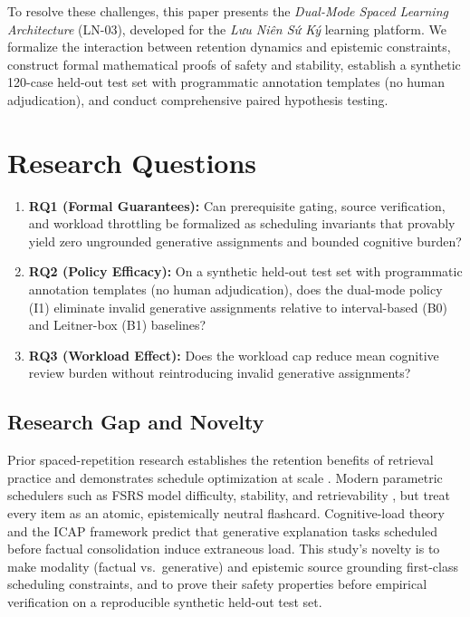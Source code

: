 \documentclass[11pt,a4paper]{article}
\begin{document}
To resolve these challenges, this paper presents the \textit{Dual-Mode Spaced Learning Architecture} (LN-03), developed for the \textit{Lưu Niên Sứ Ký} learning platform. We formalize the interaction between retention dynamics and epistemic constraints, construct formal mathematical proofs of safety and stability, establish a synthetic 120-case held-out test set with programmatic annotation templates (no human adjudication), and conduct comprehensive paired hypothesis testing.

\section{Research Questions}

\begin{enumerate}[label=\textbf{RQ\arabic*}, leftmargin=2.4em]
    \item \textbf{RQ1 (Formal Guarantees):} Can prerequisite gating, source verification, and workload throttling be formalized as scheduling invariants that provably yield zero ungrounded generative assignments and bounded cognitive burden?
    \item \textbf{RQ2 (Policy Efficacy):} On a synthetic held-out test set with programmatic annotation templates (no human adjudication), does the dual-mode policy (I1) eliminate invalid generative assignments relative to interval-based (B0) and Leitner-box (B1) baselines?
    \item \textbf{RQ3 (Workload Effect):} Does the workload cap reduce mean cognitive review burden without reintroducing invalid generative assignments?
\end{enumerate}

\subsection{Research Gap and Novelty}

Prior spaced-repetition research establishes the retention benefits of retrieval practice \cite{roediger2006, karpicke2008} and demonstrates schedule optimization at scale \cite{settles2016half, tabibian2019}. Modern parametric schedulers such as FSRS model difficulty, stability, and retrievability \cite{ye2024fsrs}, but treat every item as an atomic, epistemically neutral flashcard. Cognitive-load theory \cite{sweller1988} and the ICAP framework \cite{chi2009} predict that generative explanation tasks scheduled before factual consolidation induce extraneous load. This study's novelty is to make modality (factual vs.\ generative) and epistemic source grounding first-class scheduling constraints, and to prove their safety properties before empirical verification on a reproducible synthetic held-out test set.
\end{document}
